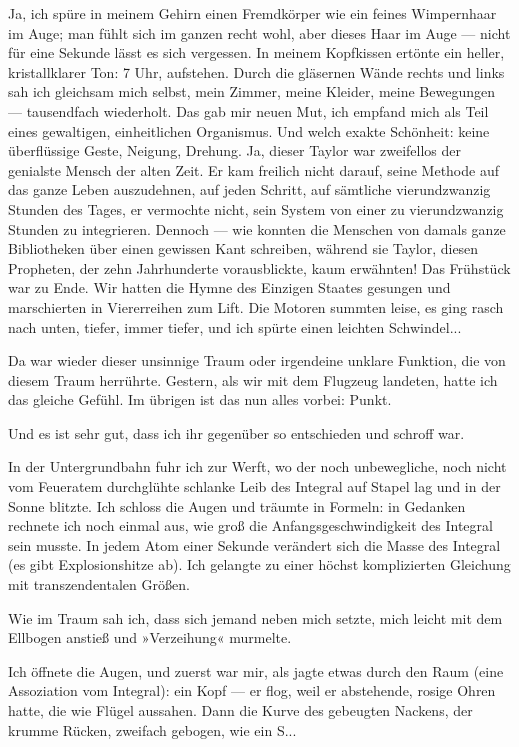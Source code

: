 Ja, ich spüre in meinem Gehirn einen Fremdkörper wie ein feines
Wimpernhaar im Auge; man fühlt sich im ganzen recht wohl, aber
dieses Haar im Auge — nicht für eine Sekunde lässt es sich
vergessen. In meinem Kopfkissen ertönte ein heller, kristallklarer
Ton: 7 Uhr, aufstehen. Durch die gläsernen Wände rechts und links
sah ich gleichsam mich selbst, mein Zimmer, meine Kleider, meine
Bewegungen — tausendfach wiederholt. Das gab mir neuen Mut, ich
empfand mich als Teil eines gewaltigen, einheitlichen Organismus.
Und welch exakte Schönheit: keine überflüssige Geste, Neigung,
Drehung. Ja, dieser Taylor war zweifellos der genialste Mensch der
alten Zeit. Er kam freilich nicht darauf, seine Methode auf das
ganze Leben auszudehnen, auf jeden Schritt, auf sämtliche
vierundzwanzig Stunden des Tages, er vermochte nicht, sein System
von einer zu vierundzwanzig Stunden zu integrieren. Dennoch — wie
konnten die Menschen von damals ganze Bibliotheken über einen
gewissen Kant schreiben, während sie Taylor, diesen Propheten, der
zehn Jahrhunderte vorausblickte, kaum erwähnten! Das Frühstück war
zu Ende. Wir hatten die Hymne des Einzigen Staates gesungen und
marschierten in Viererreihen zum Lift. Die Motoren summten leise,
es ging rasch nach unten, tiefer, immer tiefer, und ich spürte
einen leichten Schwindel...

Da war wieder dieser unsinnige Traum oder irgendeine unklare
Funktion, die von diesem Traum herrührte. Gestern, als wir mit dem
Flugzeug landeten, hatte ich das gleiche Gefühl. Im übrigen ist das
nun alles vorbei: Punkt.

Und es ist sehr gut, dass ich ihr gegenüber so entschieden und
schroff war.

In der Untergrundbahn fuhr ich zur Werft, wo der noch unbewegliche,
noch nicht vom Feueratem durchglühte schlanke Leib des Integral auf
Stapel lag und in der Sonne blitzte. Ich schloss die Augen und
träumte in Formeln: in Gedanken rechnete ich noch einmal aus, wie
groß die Anfangsgeschwindigkeit des Integral sein musste. In jedem
Atom einer Sekunde verändert sich die Masse des Integral (es gibt
Explosionshitze ab). Ich gelangte zu einer höchst komplizierten
Gleichung mit transzendentalen Größen.

Wie im Traum sah ich, dass sich jemand neben mich setzte, mich
leicht mit dem Ellbogen anstieß und »Verzeihung« murmelte.

Ich öffnete die Augen, und zuerst war mir, als jagte etwas durch
den Raum (eine Assoziation vom Integral): ein Kopf — er flog, weil
er abstehende, rosige Ohren hatte, die wie Flügel aussahen. Dann
die Kurve des gebeugten Nackens, der krumme Rücken, zweifach
gebogen, wie ein S...

